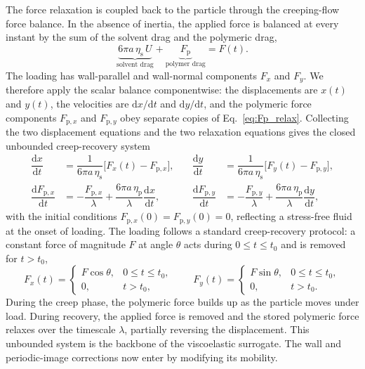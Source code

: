 \documentclass{elsarticle}
\begin{document}
The force relaxation is coupled back to the particle through the
creeping-flow force balance. In the absence of inertia, the applied force
is balanced at every instant by the sum of the solvent drag and the
polymeric drag,
\begin{equation}
\underbrace{6\pi a\,\eta_{\mathrm{s}}\,U}_{\text{solvent drag}}
+ \underbrace{F_{\mathrm{p}}}_{\text{polymer drag}}
= F(t).
\label{eq:ve_balance_unbounded}
\end{equation}
The loading has wall-parallel and wall-normal components $F_x$ and
$F_y$. We therefore apply the scalar balance componentwise: the
displacements are $x(t)$ and $y(t)$, the velocities are
$\mathrm{d}x/\mathrm{d}t$ and $\mathrm{d}y/\mathrm{d}t$, and the
polymeric force components $F_{\mathrm{p},x}$ and
$F_{\mathrm{p},y}$ obey separate copies of
Eq.~\eqref{eq:Fp_relax}. Collecting the two displacement equations and
the two relaxation equations gives the closed unbounded creep-recovery
system
\begin{equation}
\label{eq:oldroyd_b_ode_unbounded}
\begin{aligned}
\dfrac{\mathrm{d}x}{\mathrm{d}t}
&= \dfrac{1}{6\pi a\,\eta_{\mathrm{s}}}
\bigl[F_x(t) - F_{\mathrm{p},x}\bigr],
&\quad
\dfrac{\mathrm{d}y}{\mathrm{d}t}
&= \dfrac{1}{6\pi a\,\eta_{\mathrm{s}}}
\bigl[F_y(t) - F_{\mathrm{p},y}\bigr],
\\[0.5em]
\dfrac{\mathrm{d}F_{\mathrm{p},x}}{\mathrm{d}t}
&= -\dfrac{F_{\mathrm{p},x}}{\lambda}
+ \dfrac{6\pi a\,\eta_{\mathrm{p}}}{\lambda}\dfrac{\mathrm{d}x}{\mathrm{d}t},
&\quad
\dfrac{\mathrm{d}F_{\mathrm{p},y}}{\mathrm{d}t}
&= -\dfrac{F_{\mathrm{p},y}}{\lambda}
+ \dfrac{6\pi a\,\eta_{\mathrm{p}}}{\lambda}\dfrac{\mathrm{d}y}{\mathrm{d}t},
\end{aligned}
\end{equation}
with the initial conditions $F_{\mathrm{p},x}(0)=F_{\mathrm{p},y}(0)=0$,
reflecting a stress-free fluid at the onset of loading. The loading
follows a standard creep-recovery protocol: a constant force of magnitude
$F$ at angle $\theta$ acts during $0\le t\le t_0$ and is removed for
$t>t_0$,
\begin{equation}
\label{eq:ve_forcing}
F_x(t)=
\begin{cases}
F\cos\theta, & 0\le t\le t_0,\\
0, & t>t_0,
\end{cases}
\qquad
F_y(t)=
\begin{cases}
F\sin\theta, & 0\le t\le t_0,\\
0, & t>t_0.
\end{cases}
\end{equation}
During the creep phase, the polymeric force builds up as the particle
moves under load. During recovery, the applied force is removed and the
stored polymeric force relaxes over the timescale $\lambda$, partially
reversing the displacement. This unbounded system is the backbone of the
viscoelastic surrogate. The wall and periodic-image corrections now enter
by modifying its mobility.
\end{document}
